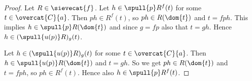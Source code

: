
\begin{proof}
Let $R\in \sievecat{f}$.
Let $h \in \spull{p}R^f(t)$ for some $t\in \overcat{C}{a}$. 
Then $ph \in R^f(t)$, so $ph \in R(\dom{t})$ and $t = fph$.
This implies $h\in \spull{p}R(\dom{t})$ and since $g = fp$ also that $t = gh$.
Hence $h\in (\spull{u(p)}R)_g(t)$.

Let $h \in (\spull{u(p)}R)_g(t)$ for some $t\in \overcat{C}{a}$.
Then $h \in \spull{u(p)}R(\dom{t})$ and $t = gh$.
So we get $ph \in R(\dom{t})$ and $t = fph$, 
so $ph\in R^f(t)$.
Hence also $h\in \spull{p}R^f(t)$.
\end{proof}
